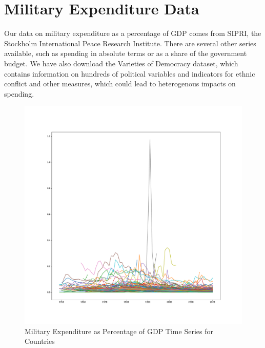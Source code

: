 \documentclass{report}
\begin{document}
	\newpage \clearpage

    \section*{Military Expenditure Data}

    Our data on military expenditure as a percentage of GDP comes from SIPRI, the Stockholm International
	Peace Research Institute. There are several other series available, such as spending in absolute terms or as a share of the government budget. We have also download the Varieties of Democracy dataset, which contains information on hundreds of political variables and indicators for ethnic conflict and other measures, which could lead to heterogenous impacts on spending.

	\begin{figure}[h!]
		\centering
		\caption{Military Expenditure as Percentage of GDP Time Series for Countries}
		\label{Milex_GDP_Time_Series}	
		\includegraphics[width=\linewidth,keepaspectratio=true]{../Output/Figures/Milex_GDP_Time_Series.pdf}
	\end{figure}
\end{document}
